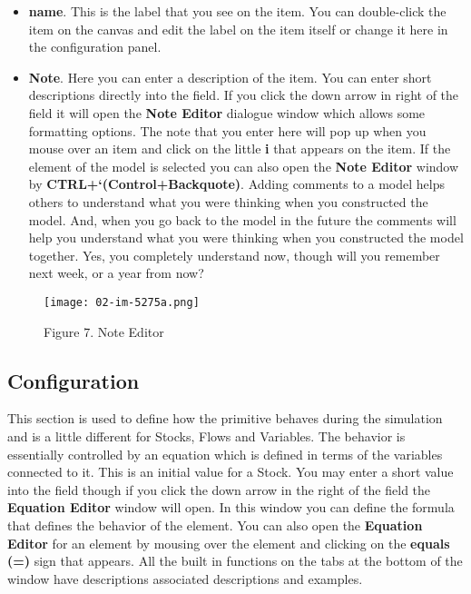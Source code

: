 \documentclass[]{memoir}
\makeatletter
\def\maxwidth{\ifdim\Gin@nat@width>\linewidth\linewidth
\else\Gin@nat@width\fi}
\let\Oldincludegraphics\includegraphics
\renewcommand{\includegraphics}[1]{\Oldincludegraphics[width=\maxwidth]{#1}}
\renewcommand{\u}[1]{\textbf{#1}}
\renewcommand{\a}[1]{\textbf{#1}}
\makeatother
\begin{document}
\begin{itemize}
\itemsep1pt\parskip0pt
\item
  \a{name}. This is the label that you see on the item. You can
  double-click the item on the canvas and edit the label on the item
  itself or change it here in the configuration panel.
\item
  \a{Note}. Here you can enter a description of the item. You can enter
  short descriptions directly into the field. If you click the down
  arrow in right of the field it will open the \u{Note Editor} dialogue
  window which allows some formatting options. The note that you enter
  here will pop up when you mouse over an item and click on the little
  \u{i} that appears on the item. If the element of the model is
  selected you can also open the \u{Note Editor} window by
  \u{CTRL+`(Control+Backquote)}. Adding comments to a model helps others
  to understand what you were thinking when you constructed the model.
  And, when you go back to the model in the future the comments will
  help you understand what you were thinking when you constructed the
  model together. Yes, you completely understand now, though will you
  remember next week, or a year from now?
\end{itemize}

\begin{figure}[htbp]
\centering
\texttt{[image: 02-im-5275a.png]}
\caption{Figure 7. Note Editor}
\end{figure}

\subsection{Configuration}

This section is used to define how the primitive behaves during the
simulation and is a little different for Stocks, Flows and Variables.
The behavior is essentially controlled by an equation which is defined
in terms of the variables connected to it. This is an initial value for
a Stock. You may enter a short value into the field though if you click
the down arrow in the right of the field the \u{Equation Editor} window
will open. In this window you can define the formula that defines the
behavior of the element. You can also open the \u{Equation Editor} for
an element by mousing over the element and clicking on the
\u{equals (=)} sign that appears. All the built in functions on the tabs
at the bottom of the window have descriptions associated descriptions
and examples.
\end{document}
